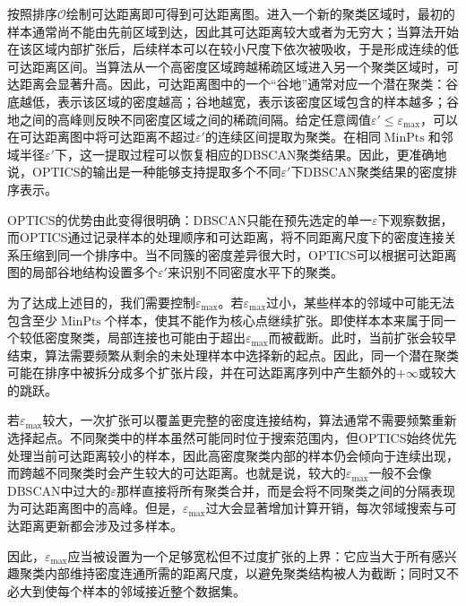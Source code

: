 按照排序$\mathcal{O}$绘制可达距离即可得到可达距离图。进入一个新的聚类区域时，最初的样本通常尚不能由先前区域到达，因此其可达距离较大或者为无穷大；当算法开始在该区域内部扩张后，后续样本可以在较小尺度下依次被吸收，于是形成连续的低可达距离区间。当算法从一个高密度区域跨越稀疏区域进入另一个聚类区域时，可达距离会显著升高。因此，可达距离图中的一个“谷地”通常对应一个潜在聚类：谷底越低，表示该区域的密度越高；谷地越宽，表示该密度区域包含的样本越多；谷地之间的高峰则反映不同密度区域之间的稀疏间隔。给定任意阈值$\varepsilon'\leqslant\varepsilon_{\max}$，可以在可达距离图中将可达距离不超过$\varepsilon'$的连续区间提取为聚类。在相同$\operatorname{MinPts}$和邻域半径$\varepsilon'$下，这一提取过程可以恢复相应的DBSCAN聚类结果。因此，更准确地说，OPTICS的输出是一种能够支持提取多个不同$\varepsilon'$下DBSCAN聚类结果的密度排序表示。\par
OPTICS的优势由此变得很明确：DBSCAN只能在预先选定的单一$\varepsilon$下观察数据，而OPTICS通过记录样本的处理顺序和可达距离，将不同距离尺度下的密度连接关系压缩到同一个排序中。当不同簇的密度差异很大时，OPTICS可以根据可达距离图的局部谷地结构设置多个$\varepsilon'$来识别不同密度水平下的聚类。
\begin{note}
	为了达成上述目的，我们需要控制$\varepsilon_{\max}$。若$\varepsilon_{\max}$过小，某些样本的邻域中可能无法包含至少$\operatorname{MinPts}$个样本，使其不能作为核心点继续扩张。即使样本本来属于同一个较低密度聚类，局部连接也可能由于超出$\varepsilon_{\max}$而被截断。此时，当前扩张会较早结束，算法需要频繁从剩余的未处理样本中选择新的起点。因此，同一个潜在聚类可能在排序中被拆分成多个扩张片段，并在可达距离序列中产生额外的$+\infty$或较大的跳跃。\par
	若$\varepsilon_{\max}$较大，一次扩张可以覆盖更完整的密度连接结构，算法通常不需要频繁重新选择起点。不同聚类中的样本虽然可能同时位于搜索范围内，但OPTICS始终优先处理当前可达距离较小的样本，因此高密度聚类内部的样本仍会倾向于连续出现，而跨越不同聚类时会产生较大的可达距离。也就是说，较大的$\varepsilon_{\max}$一般不会像DBSCAN中过大的$\varepsilon$那样直接将所有聚类合并，而是会将不同聚类之间的分隔表现为可达距离图中的高峰。但是，$\varepsilon_{\max}$过大会显著增加计算开销，每次邻域搜索与可达距离更新都会涉及过多样本。\par
	因此，$\varepsilon_{\max}$应当被设置为一个足够宽松但不过度扩张的上界：它应当大于所有感兴趣聚类内部维持密度连通所需的距离尺度，以避免聚类结构被人为截断；同时又不必大到使每个样本的邻域接近整个数据集。
\end{note}
